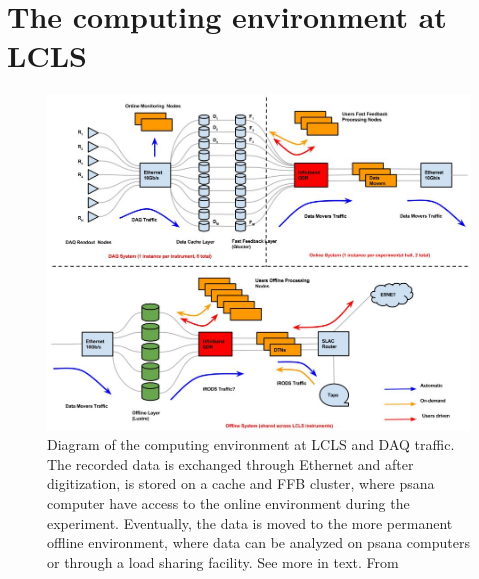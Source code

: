 \section{The computing environment at LCLS}\label{sec:LCLS-computing}
\begin{figure}
	\centering
		\includegraphics[width=1.00\textwidth]{images/daq-architecture.JPG}
	\caption{Diagram of the computing environment at LCLS and DAQ traffic. The recorded data is exchanged through Ethernet and after digitization, is stored on a cache and FFB cluster, where psana computer have access to the online environment during the experiment. Eventually, the data is moved to the more permanent offline environment, where data can be analyzed on psana computers or through a load sharing facility. See more in text. From \citep{Amadeo-2016-SLAC}}
	\label{fig:daq-architecture}
\end{figure}
